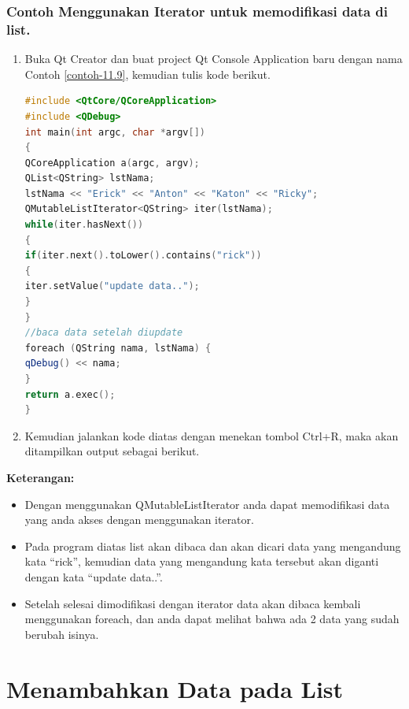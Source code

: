 \subsubsection*{Contoh  Menggunakan Iterator untuk memodifikasi data di list.}

\begin{enumerate}

\item
  Buka Qt Creator dan buat project Qt Console Application baru dengan
  nama Contoh \ref{contoh-11.9}, kemudian tulis kode berikut.

\begin{lstlisting}[language=c++, caption= Menggunakan Iterator untuk memodifikasi data di list, label=contoh-11.9]
#include <QtCore/QCoreApplication>
#include <QDebug>
int main(int argc, char *argv[])
{
QCoreApplication a(argc, argv);
QList<QString> lstNama;
lstNama << "Erick" << "Anton" << "Katon" << "Ricky";
QMutableListIterator<QString> iter(lstNama);
while(iter.hasNext())
{
if(iter.next().toLower().contains("rick"))
{
iter.setValue("update data..");
}
}
//baca data setelah diupdate
foreach (QString nama, lstNama) {
qDebug() << nama;
}
return a.exec();
}
\end{lstlisting}
\item
  Kemudian jalankan kode diatas dengan menekan tombol Ctrl+R, maka akan
  ditampilkan output sebagai berikut.
\end{enumerate}

\textbf{Keterangan:}

\begin{itemize}

\item
  Dengan menggunakan QMutableListIterator anda dapat memodifikasi data
  yang anda akses dengan menggunakan iterator.
\item
  Pada program diatas list akan dibaca dan akan dicari data yang
  mengandung kata ``rick'', kemudian data yang mengandung kata tersebut
  akan diganti dengan kata ``update data..''.
\item
  Setelah selesai dimodifikasi dengan iterator data akan dibaca kembali
  menggunakan foreach, dan anda dapat melihat bahwa ada 2 data yang
  sudah berubah isinya.
\end{itemize}

\section{Menambahkan Data pada
List}\label{menambahkan-data-pada-list}

